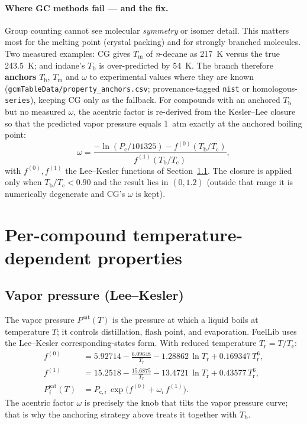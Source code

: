 \documentclass[11pt]{article}
\newcommand{\Tb}{T_{\mathrm{b}}}
\newcommand{\Tm}{T_{\mathrm{m}}}
\newcommand{\Tc}{T_{\mathrm{c}}}
\newcommand{\Pc}{P_{\mathrm{c}}}
\newcommand{\Tr}{T_{\mathrm{r}}}
\begin{document}
\paragraph{Where GC methods fail --- and the fix.}
Group counting cannot see molecular \emph{symmetry} or isomer detail. This
matters most for the melting point (crystal packing) and for strongly
branched molecules. Two measured examples: CG gives $\Tm$ of \emph{n}-decane
as \SI{217}{K} versus the true \SI{243.5}{K}; and indane's $\Tb$ is
over-predicted by \SI{54}{K}. The branch therefore \textbf{anchors} $\Tb$,
$\Tm$ and $\omega$ to experimental values where they are known
(\texttt{gcmTableData/property\_anchors.csv}; provenance-tagged
\texttt{nist} or homologous-\texttt{series}), keeping CG only as the
fallback. For compounds with an anchored $\Tb$ but no measured $\omega$, the
acentric factor is re-derived from the Kesler--Lee closure so that the
predicted vapor pressure equals \SI{1}{atm} exactly at the anchored boiling
point:
\begin{equation}
  \omega =
  \frac{-\ln(\Pc/101325) - f^{(0)}(\Tb/\Tc)}{f^{(1)}(\Tb/\Tc)},
  \label{eq:kl}
\end{equation}
with $f^{(0)}, f^{(1)}$ the Lee--Kesler functions of
Section~\ref{sec:psat}. The closure is applied only when
$\Tb/\Tc < 0.90$ and the result lies in $(0, 1.2)$ (outside that range it is
numerically degenerate and CG's $\omega$ is kept).

\section{Per-compound temperature-dependent properties}

\subsection{Vapor pressure (Lee--Kesler)}\label{sec:psat}
The vapor pressure $P^{\mathrm{sat}}(T)$ is the pressure at which a liquid
boils at temperature $T$; it controls distillation, flash point, and
evaporation. FuelLib uses the Lee--Kesler corresponding-states form. With
reduced temperature $\Tr = T/\Tc$:
\begin{align}
  f^{(0)} &= 5.92714 - \frac{6.09648}{\Tr} - 1.28862\,\ln \Tr
             + 0.169347\, \Tr^{6},\\
  f^{(1)} &= 15.2518 - \frac{15.6875}{\Tr} - 13.4721\,\ln \Tr
             + 0.43577\, \Tr^{6},\\
  P^{\mathrm{sat}}_i(T) &= P_{\mathrm{c},i}\,
     \exp\!\big( f^{(0)} + \omega_i\, f^{(1)} \big).
  \label{eq:leekesler}
\end{align}
The acentric factor $\omega$ is precisely the knob that tilts the vapor
pressure curve; that is why the anchoring strategy above treats it together
with $\Tb$.
\end{document}
